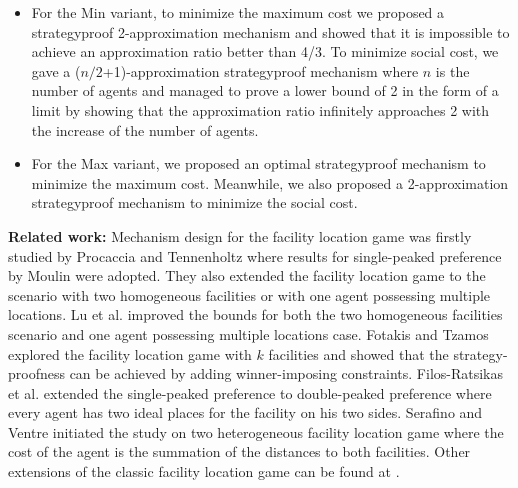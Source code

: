 \documentclass[twoside,11pt]{article}
\begin{document}
\begin{itemize}
\item For the Min variant, to minimize the maximum cost we proposed a strategyproof 2-approximation mechanism and showed that it is impossible to achieve an approximation ratio better than 4/3. To minimize social cost, we gave a ($n/2$+1)-approximation strategyproof mechanism where $n$ is the number of agents and managed to prove a lower bound of 2 in the form of a limit by showing that the approximation ratio infinitely approaches 2 with the increase of the number of agents.

\item For the Max variant, we proposed an optimal strategyproof mechanism to minimize the maximum cost. Meanwhile, we also proposed a 2-approximation strategyproof mechanism to minimize the social cost.
\end{itemize}
\noindent\textbf{Related work:}
Mechanism design for the facility location game was firstly studied by Procaccia and Tennenholtz \cite{procaccia2009approximate} where results for single-peaked preference by Moulin \cite{moulin1980strategy} were adopted. They also extended the facility location game to the scenario with two homogeneous facilities or with one agent possessing multiple locations. Lu et al.  \cite{lu2009tighter} \cite{lu2010asymptotically} improved the bounds for both the two homogeneous facilities scenario and one agent possessing multiple locations case. Fotakis and Tzamos \cite{fotakis2010winner} explored the facility location game with $k$ facilities and showed that the strategy-proofness can be achieved by adding winner-imposing constraints. Filos-Ratsikas et al. \cite{Filos-RatsikasL15} extended the single-peaked preference to double-peaked preference where every agent has two ideal places for the facility on his two sides. Serafino and Ventre \cite{serafino2014heterogeneous,serafino2015truthful} initiated the study on two heterogeneous facility location game where the cost of the agent is the summation of the distances to both facilities. Other extensions of the classic facility location game can be found at
\cite{alon2010strategyproof,fotakis2014power,escoffier2011strategy,dokow2012mechanism,feldman2013strategyproof,zhang2014strategyproof}.

\end{document}
